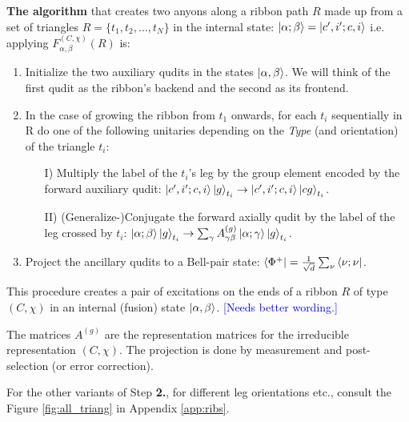 \documentclass[two column]{article}
\newcommand{\caro}[1]{\textcolor{red}{[#1]}}
\newcommand{\jovan}[1]{\textcolor{blue}{[#1]}}
\begin{document}

\textbf{The algorithm} that creates two anyons along a ribbon path $R$ made up from a set of triangles $R = \{t_1, t_2, \ldots, t_N\}$ in the internal state: $\ket{\alpha; \beta} = \ket{c', i'; c, i}$ i.e. applying $F_{\alpha, \beta}^{(C,\chi)}(R)$ is:\begin{enumerate}
    \item Initialize the two auxiliary qudits in the states $\ket{\alpha, \beta}$. We will think of the first qudit as the ribbon's backend and the second as its frontend.
    \item In the case of growing the ribbon from $t_1$ onwards, for each $t_i$ sequentially in R do one of the following unitaries depending on the \textit{Type} (and orientation) of the triangle $t_i$: \begin{itemize}
        \item[I)] Multiply the label of the $t_i$'s leg by the group element encoded by the forward auxiliary qudit: $\ket{c', i';c, i}\ket{g}_{t_i} \rightarrow \ket{c', i';c, i}\ket{cg}_{t_i}$.
        \item[II)] (Generalize-)Conjugate the forward axially qudit by the label of the leg crossed by $t_i$: $\ket{\alpha;\beta}\ket{g}_{t_i} \rightarrow \sum_\gamma A_{\gamma\beta}^{(g)}\ket{\alpha;\gamma}\ket{g}_{t_i}$.
    \end{itemize}
    \item Project the ancillary qudits to a Bell-pair state: $\bra{\Phi^+} = \frac{1}{\sqrt{d}}\sum_\nu \bra{\nu; \nu}$.
\end{enumerate}

This procedure creates a pair of excitations on the ends of a ribbon $R$ of type $(C, \chi)$ in an internal (fusion) state $\ket{\alpha, \beta}$. \jovan{Needs better wording.}

The matrices $A^{(g)}$ are the representation matrices for the irreducible representation $(C, \chi)$. The projection is done by measurement and post-selection (or error correction).

For the other variants of Step \textbf{2.}, for different leg orientations etc., consult the Figure \ref{fig:all_triang} in Appendix \ref{app:ribs}. 
\end{document}
